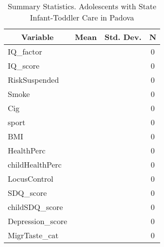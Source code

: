 
\begin{table}[htbp]\centering \caption{Summary Statistics. Adolescents with State Infant-Toddler Care in Padova \label{bothAdolasiloStatPadova}}
\begin{tabular}{l c c  c}\hline\hline
\multicolumn{1}{c}{\textbf{Variable}} & \textbf{Mean}
 & \textbf{Std. Dev.} & \textbf{N}\\ \hline
IQ\_factor &  &   & 0\\
IQ\_score &  &   & 0\\
RiskSuspended &  &   & 0\\
Smoke &  &   & 0\\
Cig &  &   & 0\\
sport &  &   & 0\\
BMI &  &   & 0\\
HealthPerc &  &   & 0\\
childHealthPerc &  &   & 0\\
LocusControl &  &   & 0\\
SDQ\_score &  &   & 0\\
childSDQ\_score &  &   & 0\\
Depression\_score &  &   & 0\\
MigrTaste\_cat &  &   & 0\\
\hline\end{tabular}
\end{table}
